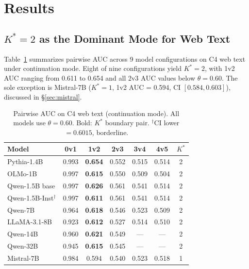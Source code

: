 \documentclass[11pt,a4paper]{article}
\begin{document}
\section{Results}

\subsection{$K^*\!=\!2$ as the Dominant Mode for Web Text}\label{sec:c4}

Table~\ref{tab:c4_main} summarizes pairwise AUC across 9 model configurations on C4 web text under continuation mode. Eight of nine configurations yield $K^*\!=\!2$, with 1v2 AUC ranging from 0.611 to 0.654 and all 2v3 AUC values below $\theta\!=\!0.60$. The sole exception is Mistral-7B ($K^*\!=\!1$, 1v2 AUC = 0.594, CI $[0.584, 0.603]$), discussed in \S\ref{sec:mistral}.

\begin{table}[t]
\centering
\small
\caption{Pairwise AUC on C4 web text (continuation mode). All models use $\theta = 0.60$. Bold: $K^*$ boundary pair. $^\dagger$CI lower $= 0.6015$, borderline.}
\label{tab:c4_main}
\begin{tabular}{lcccccc}
\toprule
Model & 0v1 & \textbf{1v2} & 2v3 & 3v4 & 4v5 & $K^*$ \\
\midrule
Pythia-1.4B        & 0.993 & \textbf{0.654} & 0.552 & 0.515 & 0.514 & 2 \\
OLMo-1B            & 0.997 & \textbf{0.615} & 0.550 & 0.509 & 0.504 & 2 \\
Qwen-1.5B base     & 0.997 & \textbf{0.626} & 0.561 & 0.541 & 0.514 & 2 \\
Qwen-1.5B-Inst$^\dagger$ & 0.997 & \textbf{0.611} & 0.561 & 0.541 & 0.514 & 2 \\
Qwen-7B            & 0.964 & \textbf{0.618} & 0.546 & 0.523 & 0.509 & 2 \\
LLaMA-3.1-8B       & 0.923 & \textbf{0.612} & 0.527 & 0.514 & 0.510 & 2 \\
Qwen-14B           & 0.960 & \textbf{0.621} & 0.549 &   ---  &  ---  & 2 \\
Qwen-32B           & 0.945 & \textbf{0.615} & 0.545 &   ---  &  ---  & 2 \\
\midrule
Mistral-7B         & 0.984 & 0.594 & 0.540 & 0.523 & 0.518 & 1 \\
\bottomrule
\end{tabular}
\end{table}
\end{document}
